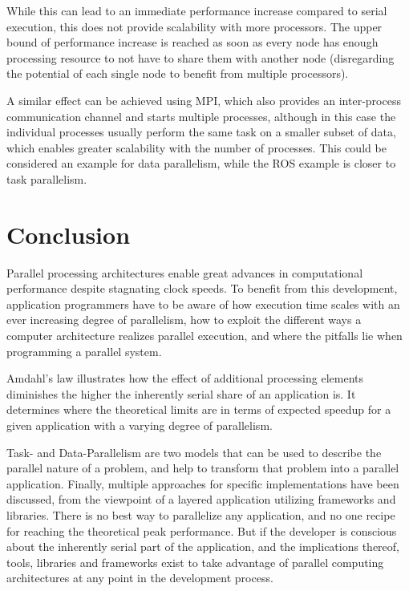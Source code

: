 \documentclass[BCOR20mm,DIV14,10pt,headinclude,footexclude,bibtotoc,liststotoc]{article}
\begin{document}
While this can lead to an immediate performance increase compared to serial
execution, this does not provide scalability with more processors. The upper
bound of performance increase is reached as soon as every node has enough
processing resource to not have to share them with another node (disregarding
the potential of each single node to benefit from multiple processors).

A similar effect can be achieved using MPI, which also provides an inter-process
communication channel and starts multiple processes, although in this case the
individual processes usually perform the same task on a smaller subset of data,
which enables greater scalability with the number of processes. This could be
considered an example for data parallelism, while the ROS example is closer to
task parallelism.

\section{Conclusion}
Parallel processing architectures enable great advances in computational
performance despite stagnating clock speeds. To benefit from this development,
application programmers have to be aware of how execution time scales with an
ever increasing degree of parallelism, how to exploit the different ways a
computer architecture realizes parallel execution, and where the pitfalls lie
when programming a parallel system.

Amdahl's law illustrates how the effect of additional processing elements
diminishes the higher the inherently serial share of an application is. It
determines where the theoretical limits are in terms of expected speedup for a
given application with a varying degree of parallelism.

Task- and Data-Parallelism are two models that can be used to describe the
parallel nature of a problem, and help to transform that problem into a parallel
application. Finally, multiple approaches for specific implementations have been
discussed, from the viewpoint of a layered application utilizing frameworks and
libraries. There is no best way to parallelize any application, and no one
recipe for reaching the theoretical peak performance. But if the developer is
conscious about the inherently serial part of the application, and the
implications thereof, tools, libraries and frameworks exist to take advantage of
parallel computing architectures at any point in the development process.

\newpage
\end{document}
